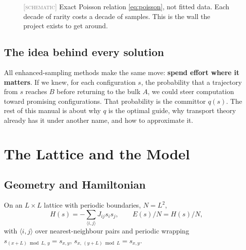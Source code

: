 \documentclass[11pt,a4paper]{article}
\newcommand{\SCHEM}{\textcolor{gray}{\footnotesize[\textsc{schematic}]}}
\begin{document}
\begin{figure}[H]\centering
{}
\caption{\SCHEM{} Exact Poisson relation \eqref{eq:poisson}, not fitted data. Each decade of
rarity costs a decade of samples. This is the wall the project exists to get around.}
\end{figure}

\subsection{The idea behind every solution}
All enhanced-sampling methods make the same move: \textbf{spend effort where it matters}. If we
knew, for each configuration $s$, the probability that a trajectory from $s$ reaches $B$ before
returning to the bulk $A$, we could steer computation toward promising configurations. That
probability is the committor $q(s)$. The rest of this manual is about why $q$ is the optimal guide,
why transport theory already has it under another name, and how to approximate it.

\section{The Lattice and the Model}\label{sec:lattice}

\subsection{Geometry and Hamiltonian}
On an $L\times L$ lattice with periodic boundaries, $N=L^2$,
\begin{equation}
H(s)=-\sum_{\langle i,j\rangle}J_{ij}s_is_j,\qquad E(s)/N = H(s)/N,
\end{equation}
with $\langle i,j\rangle$ over nearest-neighbour pairs and periodic wrapping
$s_{(x+L)\bmod L,\,y}=s_{x,y}$, $s_{x,\,(y+L)\bmod L}=s_{x,y}$.
\end{document}
